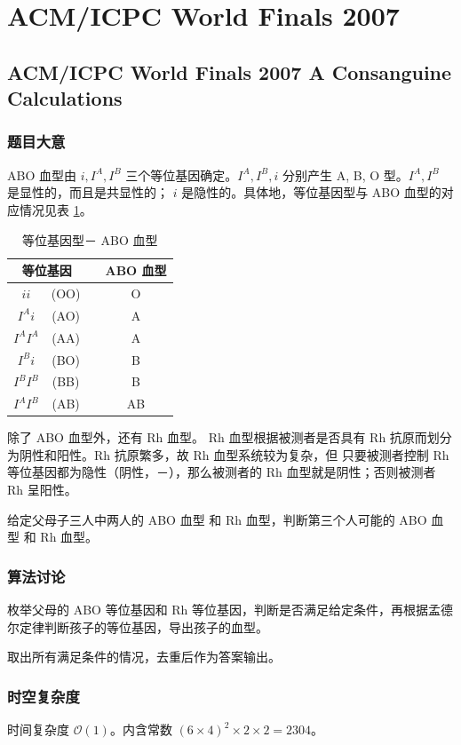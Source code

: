 
	\section{ACM/ICPC World Finals 2007}
		\subsection{ACM/ICPC World Finals 2007 A Consanguine Calculations}
			\subsubsection{题目大意}
			ABO 血型由 $i, I^A, I^B$ 三个等位基因确定。$I^A, I^B, i$ 分别产生 A, B, O 型。$I^A, I^B$ 是显性的，而且是共显性的； $i$ 是隐性的。具体地，等位基因型与 ABO 血型的对应情况见表 \ref{ta1}。
				\begin{table}[!htb]
					\centering
					\begin{tabular}{cccc}
						\toprule
							\multicolumn{2}{c}{等位基因}& & ABO 血型   \\
						\midrule
							$ii$&(OO) && O\\
							$I^Ai$&(AO) && A\\
							$I^AI^A$&(AA) && A\\
							$I^Bi$&(BO) && B\\
							$I^BI^B$&(BB) && B\\
							$I^AI^B$&(AB) && AB\\
						\bottomrule
					\end{tabular}
					\caption{等位基因型－ ABO 血型}\label{ta1}
				\end{table}
			
			除了 ABO 血型外，还有 Rh 血型。 Rh 血型根据被测者是否具有 Rh 抗原而划分为阴性和阳性。Rh 抗原繁多，故 Rh 血型系统较为复杂，但 只要被测者控制 Rh 等位基因都为隐性（阴性，－），那么被测者的 Rh 血型就是阴性；否则被测者 Rh 呈阳性。 %
				
			给定父母子三人中两人的 ABO 血型 和 Rh 血型，判断第三个人可能的 ABO 血型 和 Rh 血型。
			
		\subsubsection{算法讨论}
			枚举父母的 ABO 等位基因和 Rh 等位基因，判断是否满足给定条件，再根据孟德尔定律判断孩子的等位基因，导出孩子的血型。
			
			取出所有满足条件的情况，去重后作为答案输出。
			
			\subsubsection{时空复杂度}
				时间复杂度 $\mathcal{O}\left(1\right)$。内含常数 $(6 \times 4)^2 \times 2 \times 2 = \num{2304}$。
					
